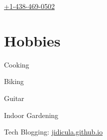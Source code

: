 \documentclass[]{jidicula-resume}
\begin{document}
\href{tel:14384690502}{+1-438-469-0502}
\sectionsep

\section{Hobbies}
\sectionsep
\begin{tightemize}
\item Cooking
\item Biking
\item Guitar
\item Indoor Gardening
\item Tech Blogging: \href{http://bit.ly/jidicula_site}{jidicula.github.io}
\end{tightemize}
\sectionsep
\end{document}
